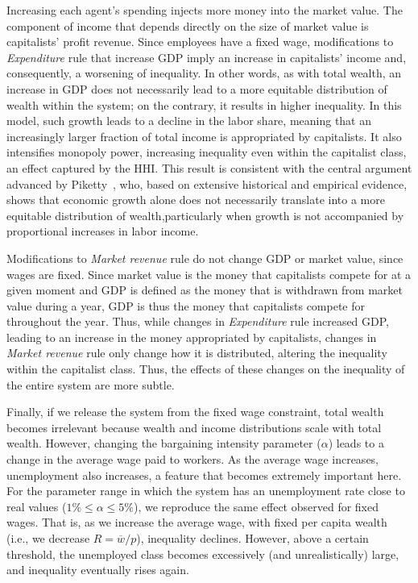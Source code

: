 \documentclass[12pt,preprint]{revtex4-1}
\begin{document}
Increasing each agent's spending injects more money into the market value. The component of income that depends directly on the size of market value is capitalists’ profit revenue. 
Since employees have a fixed wage, modifications  to {\it Expenditure } rule that increase GDP imply an increase in capitalists' income and, consequently, a worsening of inequality. 
In other words, as with total wealth, an increase in GDP does not necessarily lead to a more equitable distribution of wealth within the system; on the contrary, it results in higher inequality. 
In this model, such growth leads to a decline in the labor share, meaning that an increasingly larger fraction of total income is appropriated by capitalists. It also intensifies monopoly power, increasing inequality even within the capitalist class, an effect captured by the HHI.
This result is consistent with the central argument advanced by Piketty~\cite{piketty}, who, based on extensive historical and empirical evidence, shows that economic growth alone does not necessarily translate into a more equitable distribution of wealth,particularly when growth is not accompanied by proportional increases in labor income. 

Modifications to {\it Market revenue} rule do not change GDP or market value, since wages are fixed. Since market value is the money that capitalists compete for at a given moment and GDP is defined as the money that is withdrawn from market value during a year,  GDP is thus the money that capitalists compete for throughout the year. Thus, while changes in {\it Expenditure} rule increased GDP, leading to an increase in the money appropriated by capitalists, changes in {\it Market revenue} rule only change how it is distributed, altering the inequality within the capitalist class. Thus, the effects of these changes on the inequality of the entire system are more subtle.  

Finally, if we release the system from the fixed wage constraint, total wealth becomes irrelevant because wealth and income distributions scale with total wealth. However, changing the bargaining intensity parameter ($\alpha$) leads to a change in the average wage paid to workers. As the average wage increases, unemployment also increases, a feature that becomes extremely important here. For the parameter range in which the system has an unemployment rate close to real values ($1\%\leq\alpha\leq5\%$), we reproduce the same effect observed for fixed wages. That is, as we increase the average wage, with fixed per capita wealth (i.e., we decrease $R=\overline{w}/p$), inequality declines. However, above a certain threshold, the unemployed class becomes excessively (and unrealistically) large, and inequality eventually rises again.
\end{document}
